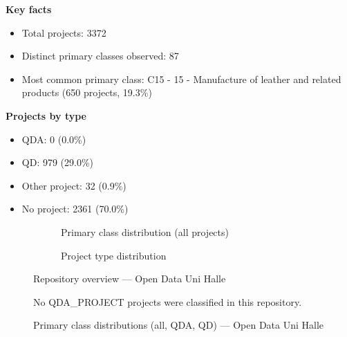 \textbf{Key facts}

\begin{itemize}
    \item Total projects: 3372
    \item Distinct primary classes observed: 87
    \item Most common primary class: C15 - 15 - Manufacture of leather and related products (650 projects, 19.3\%)
\end{itemize}

\textbf{Projects by type}

\begin{itemize}
    \item QDA: 0 (0.0\%)
    \item QD: 979 (29.0\%)
    \item Other project: 32 (0.9\%)
    \item No project: 2361 (70.0\%)
\end{itemize}

\begin{figure}[H]
    \centering
    \begin{subfigure}[t]{0.49\textwidth}
        \centering
        
        \caption{Primary class distribution (all projects)}
    \end{subfigure}
    \hfill
    \begin{subfigure}[t]{0.49\textwidth}
        \centering
        
        \caption{Project type distribution}
    \end{subfigure}
    \caption{Repository overview --- Open Data Uni Halle}
\end{figure}

\clearpage

\begin{figure}[H]
    \centering
    
    \par\vspace{0.8em}
    No QDA\_PROJECT projects were classified in this repository.
    \par\vspace{0.8em}
    
    \caption{Primary class distributions (all, QDA, QD) --- Open Data Uni Halle}
\end{figure}

